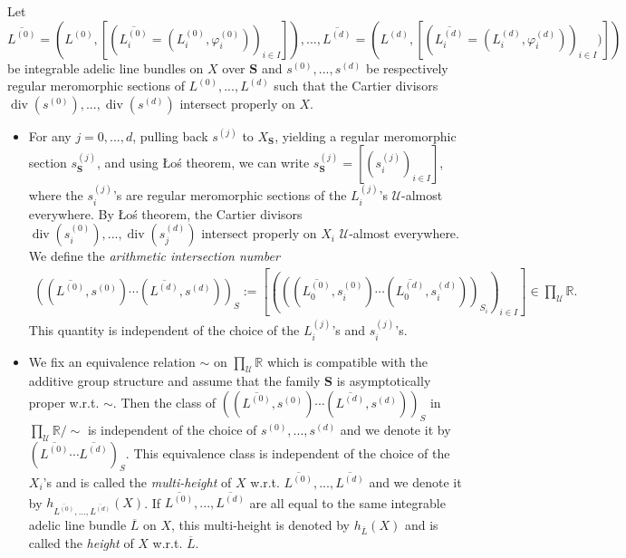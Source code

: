 \documentclass [11pt,reqno]{amsart}
\def\bR{{\mathbb{R}}}
\newcommand{\1}{\mathmybb{1}}
\def\cU{{\mathcal{U}}}
\def\div{\operatorname{div}}
\begin{document}
\begin{theorem-definition}
\label{th-def:arithmetic_intersection_product_family_tac}
Let $\overline{L^{(0)}}=(L^{(0)},[(\overline{L_{i}^{(0)}}=(L_{i}^{(0)},\varphi_{i}^{(0)}))_{i\in I}]),...,\overline{L^{(d)}}=(L^{(d)},[(\overline{L_{i}^{(d)}}=(L_{i}^{(d)},\varphi_{i}^{(d)}))_{i\in I})])$ be integrable adelic line bundles on $X$ over $\mathbf{S}$ and $s^{(0)},...,s^{(d)}$ be respectively regular meromorphic sections of $L^{(0)},...,L^{(d)}$ such that the Cartier divisors $\div(s^{(0)}),...,\div(s^{(d)})$ intersect properly on $X$. 
\begin{itemize}
	\item[(1)] For any $j=0,...,d$, pulling back $s^{(j)}$ to $X_{\mathbf{S}}$, yielding a regular meromorphic section $s^{(j)}_{\mathbf{S}}$, and using \L{}o\'s theorem, we can write $s^{(j)}_{\mathbf{S}}=[(s_{i}^{(j)})_{i\in I}]$, where the $s_{i}^{(j)}$'s are regular meromorphic sections of the $L^{(j)}_{i}$'s $\cU$-almost everywhere. By \L{}o\'s theorem, the Cartier divisors $\div(s_{i}^{(0)}),...,\div(s_{j}^{(d)})$ intersect properly on $X_{i}$ $\cU$-almost everywhere. We define the \emph{arithmetic intersection number} 
	\begin{align*}
	\left((\overline{L^{(0)}},s^{(0)})\cdots(\overline{L^{(d)}},s^{(d)})\right)_{S} := \left[\left(\left((\overline{L_{0}^{(0)}},s_{i}^{(0)})\cdots(\overline{L_{0}^{(d)}},s_{i}^{(d)})\right)_{S_{i}}\right)_{i\in I}\right]\in\displaystyle\prod_{\cU}\bR.
	\end{align*}
	This quantity is independent of the choice of the $L_{i}^{(j)}$'s and $s_{i}^{(j)}$'s.
	\item[(2)] We fix an equivalence relation $\sim$ on $\prod_{\cU}\bR$ which is compatible with the additive group structure and assume that the family $\mathbf{S}$ is asymptotically proper w.r.t. $\sim$. Then the class of $\left((\overline{L^{(0)}},s^{(0)})\cdots(\overline{L^{(d)}},s^{(d)})\right)_{S}$ in $\prod_{\cU}\bR/\sim$ is independent of the choice of $s^{(0)},...,s^{(d)}$ and we denote it by $\left(\overline{L^{(0)}}\cdots\overline{L^{(d)}}\right)_{S}$. This equivalence class is independent of the choice of the $X_{i}$'s and is called the \emph{multi-height} of $X$ w.r.t. $\overline{L^{(0)}},...,\overline{L^{(d)}}$ and we denote it by $h_{\overline{L^{(0)}},...,\overline{L^{(d)}}}(X)$. If $\overline{L^{(0)}},...,\overline{L^{(d)}}$ are all equal to the same integrable adelic line bundle $\overline{L}$ on $X$, this multi-height is denoted by $h_{\overline{L}}(X)$ and is called the \emph{height} of $X$ w.r.t. $\overline{L}$.

\end{itemize}
\end{theorem-definition}
\end{document}
